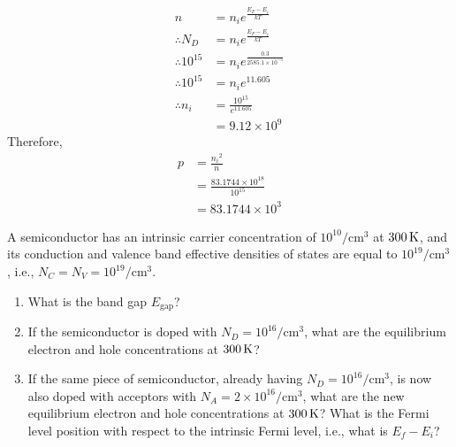 \documentclass[fleqn, a4paper, 11pt, oneside]{amsart}
\theoremstyle{definition}
\theoremstyle{theorem}
\begin{document}
\begin{solution}
	\begin{align*}
		n                  & = n_i e^{\frac{E_F - E_i}{k T}}             \\
		\therefore N_D     & = n_i e^{\frac{E_F - E_i}{k T}}             \\
		\therefore 10^{15} & = n_i e^{\frac{0.3}{2585.1 \times 10^{-5}}} \\
		\therefore 10^{15} & = n_i e^{11.605}                            \\
		\therefore n_i     & = \frac{10^{15}}{e^{11.605}}                \\
                                   & = 9.12 \times 10^9
	\end{align*}
	Therefore,
	\begin{align*}
		p & = \frac{{n_i}^2}{n}                      \\
                  & = \frac{83.1744 \times 10^{18}}{10^{15}} \\
                  & = 83.1744 \times 10^3
	\end{align*}
\end{solution}

\begin{question}
	A semiconductor has an intrinsic carrier concentration of $10^{10} \si{\per\centi\metre\cubed}$ at $300 \kelvin$, and its conduction and valence band effective densities of states are equal to $10^{19} \si{\per\centi\metre\cubed}$, i.e., $N_C = N_V = 10^{19} \si{\per\centi\metre\cubed}$.
	\begin{enumerate}
		\item
			What is the band gap $E_{\text{gap}}$?
		\item
			If the semiconductor is doped with $N_D = 10^{16} \si{\per\centi\metre\cubed}$, what are the equilibrium electron and hole concentrations at $300 \kelvin$?
		\item
			If the same piece of semiconductor, already having $N_D = 10^{16} \si{\per\centi\metre\cubed}$, is now also doped with acceptors with $N_A = 2 \times 10^{16} \si{\per\centi\metre\cubed}$, what are the new equilibrium electron and hole concentrations at $300 \kelvin$?
			What is the Fermi level position with respect to the intrinsic Fermi level, i.e., what is $E_f - E_i$?
	\end{enumerate}
\end{question}
\end{document}
